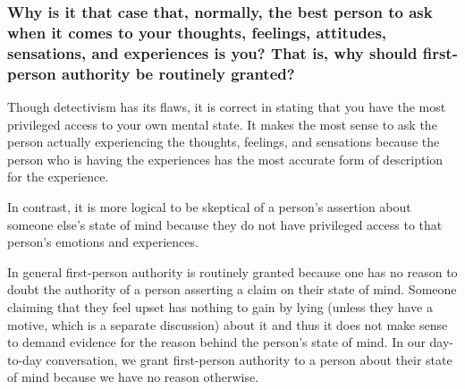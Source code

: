 \documentclass[letterpaper, 12pt]{article}
\begin{document}
\subsubsection*{Why is it that case that, normally, the best person to ask when
it comes to your thoughts, feelings, attitudes, sensations, and experiences is
you? That is, why should first-person authority be routinely granted?}
Though detectivism has its flaws, it is correct in stating that you have the
most privileged access to your own mental state. It makes the most sense to
ask the person actually experiencing the thoughts, feelings, and sensations
because the person who is having the experiences has the most accurate
form of description for the experience. \par
In contrast, it is more logical to be skeptical of a person's assertion
about someone else's state of mind because they do not have privileged access
to that person's emotions and experiences. \par
In general first-person authority is routinely granted because one has no
reason to doubt the authority of a person asserting a claim on their state
of mind. Someone claiming that they feel upset has nothing to gain by lying
(unless they have a motive, which is a separate discussion) about it and thus
it does not make sense to demand evidence for the reason behind the person's
state of mind. In our day-to-day conversation, we grant first-person
authority to a person about their state of mind because we have no reason
otherwise.
\end{document}
